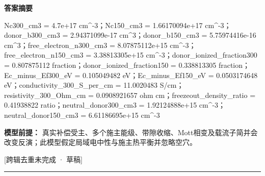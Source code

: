 \documentclass[UTF8,11pt,a4paper]{ctexart}
\begin{document}
\noindent\textbf{答案摘要}\par
Nc300\_cm3 = 4.7e+17 cm\textasciicircum{}-3；Nc150\_cm3 = 1.66170094e+17 cm\textasciicircum{}-3；donor\_b300\_cm3 = 2.94371099e-17 cm\textasciicircum{}3；donor\_b150\_cm3 = 5.75974416e-16 cm\textasciicircum{}3；free\_electron\_n300\_cm3 = 8.07875112e+15 cm\textasciicircum{}-3；free\_electron\_n150\_cm3 = 3.38813305e+15 cm\textasciicircum{}-3；donor\_ionized\_fraction300 = 0.807875112 fraction；donor\_ionized\_fraction150 = 0.338813305 fraction；Ec\_minus\_Ef300\_eV = 0.105049482 eV；Ec\_minus\_Ef150\_eV = 0.0503174648 eV；conductivity\_300\_S\_per\_cm = 11.0020483 S/cm；resistivity\_300\_Ohm\_cm = 0.0908921657 ohm cm；freezeout\_density\_ratio = 0.41938822 ratio；neutral\_donor300\_cm3 = 1.92124888e+15 cm\textasciicircum{}-3；neutral\_donor150\_cm3 = 6.61186695e+15 cm\textasciicircum{}-3\par
\noindent\textbf{模型前提：}
真实补偿受主、多个施主能级、带隙收缩、Mott相变及载流子简并会改变反演；此模型假定局域电中性与施主热平衡并忽略空穴。\par
\noindent\textcolor{red!65!black}{[跨辑去重未完成 · 草稿]} \par
\medskip\hrule\medskip
{}
\end{document}
